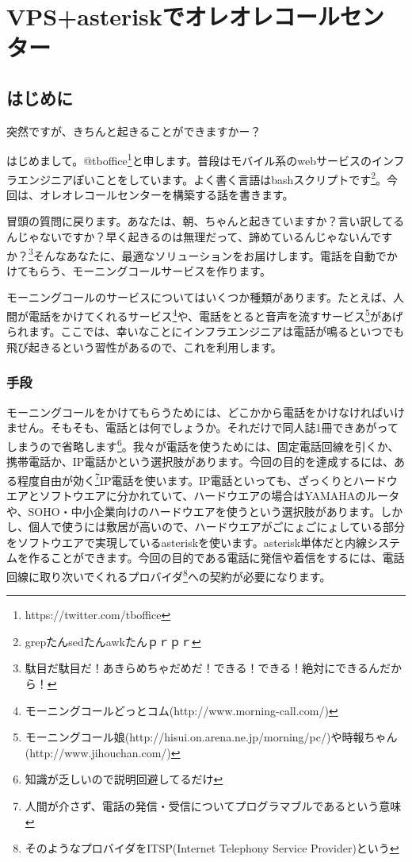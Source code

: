 \section{VPS+asteriskでオレオレコールセンター}
\subsection{はじめに}

\begin{screen}
\begin{center}
突然ですが、きちんと起きることができますかー？
\end{center}
\end{screen}

はじめまして。@tboffice\footnote{https://twitter.com/tboffice}と申します。普段はモバイル系のwebサービスのインフラエンジニアぽいことをしています。よく書く言語はbashスクリプトです\footnote{grepたんsedたんawkたんｐｒｐｒ}。今回は、オレオレコールセンターを構築する話を書きます。

冒頭の質問に戻ります。あなたは、朝、ちゃんと起きていますか？言い訳してるんじゃないですか？早く起きるのは無理だって、諦めているんじゃないんですか？\footnote{駄目だ駄目だ！あきらめちゃだめだ！できる！できる！絶対にできるんだから！}そんなあなたに、最適なソリューションをお届けします。電話を自動でかけてもらう、モーニングコールサービスを作ります。

モーニングコールのサービスについてはいくつか種類があります。たとえば、人間が電話をかけてくれるサービス\footnote{モーニングコールどっとコム(http://www.morning-call.com/)}や、電話をとると音声を流すサービス\footnote{モーニングコール娘(http://hisui.on.arena.ne.jp/morning/pc/)や時報ちゃん(http://www.jihouchan.com/)}があげられます。ここでは、幸いなことにインフラエンジニアは電話が鳴るといつでも飛び起きるという習性があるので、これを利用します。

\subsubsection{手段}
モーニングコールをかけてもらうためには、どこかから電話をかけなければいけません。そもそも、電話とは何でしょうか。それだけで同人誌1冊できあがってしまうので省略します\footnote{知識が乏しいので説明回避してるだけ}。我々が電話を使うためには、固定電話回線を引くか、携帯電話か、IP電話かという選択肢があります。今回の目的を達成するには、ある程度自由が効く\footnote{人間が介さず、電話の発信・受信についてプログラマブルであるという意味}IP電話を使います。IP電話といっても、ざっくりとハードウエアとソフトウエアに分かれていて、ハードウエアの場合はYAMAHAのルータや、SOHO・中小企業向けのハードウエアを使うという選択肢があります。しかし、個人で使うには敷居が高いので、ハードウエアがごにょごにょしている部分をソフトウエアで実現しているasteriskを使います。asterisk単体だと内線システムを作ることができます。今回の目的である電話に発信や着信をするには、電話回線に取り次いでくれるプロバイダ\footnote{そのようなプロバイダをITSP(Internet Telephony Service Provider)という}への契約が必要になります。

